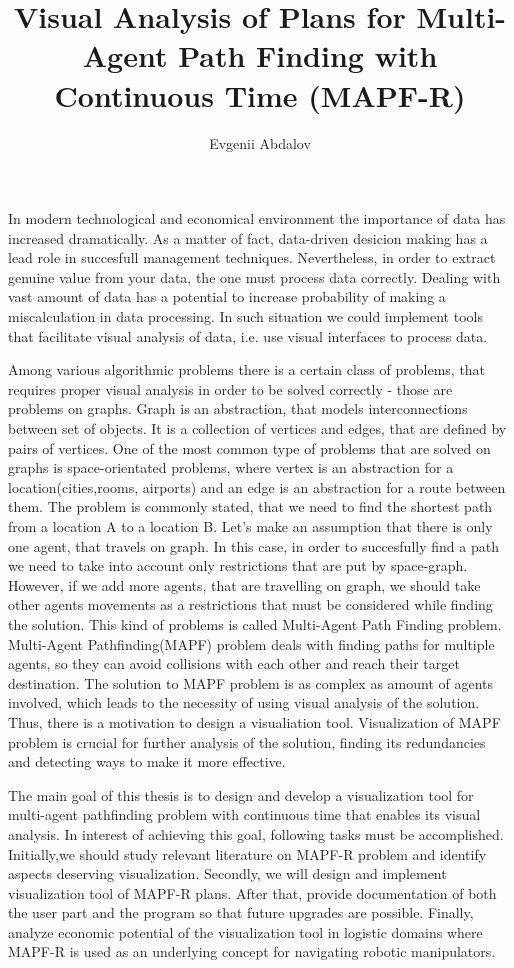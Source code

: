 \documentclass[thesis=B,english]{FITthesis}[2019/12/23]
\title{Visual Analysis of Plans for Multi-Agent Path Finding with Continuous Time (MAPF-R)}
\author{Evgenii Abdalov} %
\begin{document}
\begin{introduction}
In modern technological and economical environment the importance of data has increased dramatically. As a matter of fact, data-driven desicion making has a lead role in succesfull management techniques. Nevertheless, in order to extract genuine value from your data, the one must process data correctly. Dealing with vast amount of data has a potential to increase probability of making a miscalculation in data processing. In such situation we could implement tools that facilitate visual analysis of data, i.e. use visual interfaces to process data.

Among various algorithmic problems there is a certain class of problems, that requires proper visual analysis in order to be solved correctly - those are problems on graphs. Graph is an abstraction, that models interconnections between set of objects. It is a collection of vertices and edges, that are defined by pairs of vertices. One of the most common type of problems that are solved on graphs is space-orientated problems, where vertex is an abstraction for a location(cities,rooms, airports) and an edge is an abstraction for a route between them. The problem is commonly stated, that we need to find the shortest path from a location A to a location B. Let's make an assumption that there is only one agent, that travels on graph. In this case, in order to succesfully find a path we need to take into account only restrictions that are put by space-graph. However, if we add more agents, that are travelling on graph, we should take other agents movements as a restrictions that must be considered while finding the solution. This kind of problems is called Multi-Agent Path Finding problem. Multi-Agent Pathfinding(MAPF) problem deals with finding paths for multiple agents, so they can avoid collisions with each other and reach their target destination. The solution to MAPF problem is as complex as amount of agents involved, which leads to the necessity of using visual analysis of the solution. Thus, there is a motivation to design a visualiation tool. Visualization of MAPF problem is crucial for further analysis of the solution, finding its redundancies and detecting ways to make it more effective.
   
The main goal of this thesis is to design and develop a visualization tool for multi-agent pathfinding problem with continuous time that enables its visual analysis. In interest of achieving this goal, following tasks must be accomplished. Initially,we should study relevant literature on MAPF-R problem and identify aspects deserving visualization. Secondly,
we will design and implement visualization tool of MAPF-R plans. After that, provide documentation of both the user part and the program so that future upgrades are possible.
Finally, analyze economic potential of the visualization tool in logistic domains where MAPF-R is used as an underlying concept for navigating robotic manipulators.

\end{introduction}
\end{document}

